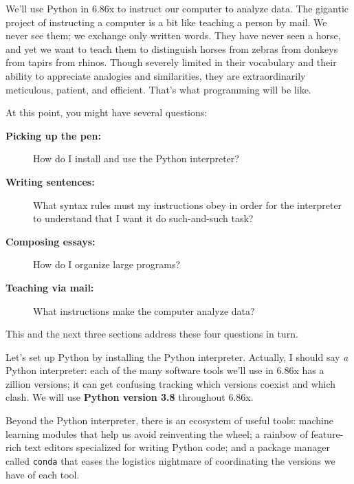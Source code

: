         We'll use Python in 6.86x to instruct our computer to analyze data.
        The gigantic project of instructing a computer is a bit like teaching a
        person by mail.  We never see them; we exchange only written words.
        They have never seen a horse, and yet we want to teach them to
        distinguish horses from zebras from donkeys from tapirs from rhinos.
        Though severely limited in their vocabulary and their ability to
        appreciate analogies and similarities, they are extraordinarily
        meticulous, patient, and efficient.
        That's what programming will be like.

        At this point, you might have several questions:
        \begin{description}
          \item[\textbf{Picking up the pen:}] How do I install and use the Python
               interpreter?
          \item[\textbf{Writing sentences:}] What syntax rules must my
               instructions obey in order for the interpreter to understand
                that I want it do such-and-such task?
          \item[\textbf{Composing essays:}] How do I organize large programs?
          \item[\textbf{Teaching via mail:}] What instructions
               make the computer analyze data?
        \end{description}
        This and the next three sections address these four
        questions in turn.

        Let's set up Python by installing the Python interpreter.
        Actually, I should say \emph{a} Python interpreter: each of the many
        software tools we'll use in 6.86x has a zillion versions; it can get
        confusing tracking which versions coexist and which clash.  We will use
        \textbf{Python version 3.8} throughout 6.86x.

        Beyond the Python interpreter, there is an ecosystem of useful tools:
        machine learning modules that help us avoid reinventing the wheel; a
        rainbow of feature-rich text editors specialized for writing Python code;
        and a package manager called \texttt{conda} that eases the logistics
        nightmare of coordinating the versions we have of each tool.



